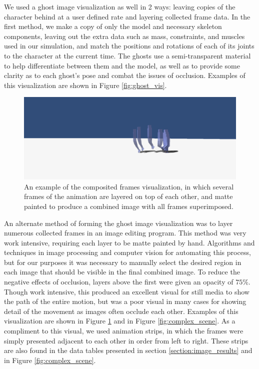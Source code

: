 We used a ghost image visualization as well in 2 ways: leaving copies of the character behind at a user defined rate and layering collected frame data.  In the first method, we make a copy of only the model and necessary skeleton components, leaving out the extra data such as mass, constraints, and muscles used in our simulation, and match the positions and rotations of each of its joints to the character at the current time.  The ghosts use a semi-transparent material to help differentiate between them and the model, as well as to provide some clarity as to each ghost's pose and combat the issues of occlusion.  Examples of this visualization are shown in Figure \ref{fig:ghost_vis}.

\begin{figure}[ht]
	\centering
	\includegraphics[width=\textwidth]{images/k200kvaryingcomposite.png}
	\caption[Composite frame visualization]{An example of the composited frames visualization, in which several frames of the animation are layered on top of each other, and matte painted to produce a combined image with all frames superimposed.}
	\label{fig:composite_vis}
\end{figure}

An alternate method of forming the ghost image visualization was to layer numerous collected frames in an image editing program.  This method was very work intensive, requiring each layer to be matte painted by hand.  Algorithms and techniques in image processing and computer vision for automating this process, but for our purposes it was necessary to manually select the desired region in each image that should be visible in the final combined image.  To reduce the negative effects of occlusion, layers above the first were given an opacity of $75\%$.  Though work intensive, this produced an excellent visual for still media to show the path of the entire motion, but was a poor visual in many cases for showing detail of the movement as images often occlude each other.  Examples of this visualization are shown in Figure \ref{fig:composite_vis} and in Figure \ref{fig:complex_scene}.  As a compliment to this visual, we used animation strips, in which the frames were simply presented adjacent to each other in order from left to right.  These strips are also found in the data tables presented in section \ref{section:image_results} and in Figure \ref{fig:complex_scene}.

